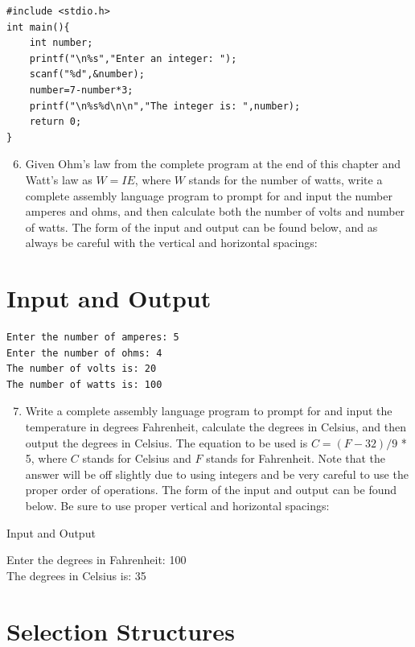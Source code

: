 \documentclass[10pt]{article}
\begin{document}
\begin{verbatim}
#include <stdio.h>
int main(){
    int number;
    printf("\n%s","Enter an integer: ");
    scanf("%d",&number);
    number=7-number*3;
    printf("\n%s%d\n\n","The integer is: ",number);
    return 0;
}
\end{verbatim}

\begin{enumerate}
  \setcounter{enumi}{5}
  \item Given Ohm's law from the complete program at the end of this chapter and Watt's law as $W=I E$, where $W$ stands for the number of watts, write a complete assembly language program to prompt for and input the number amperes and ohms, and then calculate both the number of volts and number of watts. The form of the input and output can be found below, and as always be careful with the vertical and horizontal spacings:
\end{enumerate}

\section*{Input and Output}
\begin{verbatim}
Enter the number of amperes: 5
Enter the number of ohms: 4
The number of volts is: 20
The number of watts is: 100
\end{verbatim}

\begin{enumerate}
  \setcounter{enumi}{6}
  \item Write a complete assembly language program to prompt for and input the temperature in degrees Fahrenheit, calculate the degrees in Celsius, and then output the degrees in Celsius. The equation to be used is $C=(F-32) / 9$ * 5, where $C$ stands for Celsius and $F$ stands for Fahrenheit. Note that the answer will be off slightly due to using integers and be very careful to use the proper order of operations. The form of the input and output can be found below. Be sure to use proper vertical and horizontal spacings:
\end{enumerate}

Input and Output

Enter the degrees in Fahrenheit: 100\\
The degrees in Celsius is: 35

\section*{Selection Structures}
\end{document}
